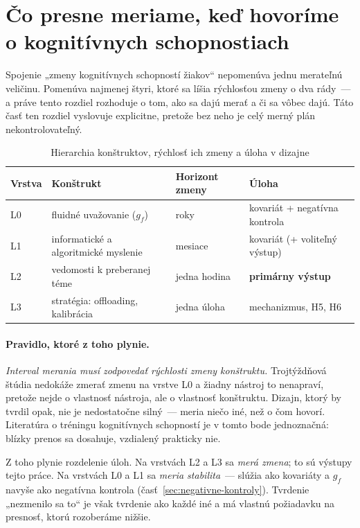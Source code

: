 \section{Čo presne meriame, keď hovoríme o kognitívnych schopnostiach}
\label{sec:konstrukty}

Spojenie „zmeny kognitívnych schopností žiakov“ nepomenúva jednu merateľnú veličinu. Pomenúva najmenej štyri, ktoré sa líšia rýchlosťou zmeny o dva rády~--- a práve tento rozdiel rozhoduje o tom, ako sa dajú merať a či sa vôbec dajú. Táto časť ten rozdiel vyslovuje explicitne, pretože bez neho je celý merný plán nekontrolovateľný.

\begin{table}[H]
\centering
\caption{Hierarchia konštruktov, rýchlosť ich zmeny a úloha v dizajne}
\label{tab:konstrukty}
\small
\begin{tabularx}{\textwidth}{@{}l X l l@{}}
\toprule
\textbf{Vrstva} & \textbf{Konštrukt} & \textbf{Horizont zmeny} & \textbf{Úloha} \\
\midrule
L0 & fluidné uvažovanie ($g_f$) & roky & kovariát + negatívna kontrola \\
L1 & informatické a algoritmické myslenie & mesiace & kovariát (+ voliteľný výstup) \\
L2 & vedomosti k preberanej téme & jedna hodina & \textbf{primárny výstup} \\
L3 & stratégia: offloading, kalibrácia & jedna úloha & mechanizmus, H5, H6 \\
\bottomrule
\end{tabularx}
\end{table}

\paragraph{Pravidlo, ktoré z toho plynie.} \emph{Interval merania musí zodpovedať rýchlosti zmeny konštruktu.} Trojtýždňová štúdia nedokáže zmerať zmenu na vrstve L0 a žiadny nástroj to nenapraví, pretože nejde o vlastnosť nástroja, ale o vlastnosť konštruktu. Dizajn, ktorý by tvrdil opak, nie je nedostatočne silný~--- meria niečo iné, než o čom hovorí. Literatúra o tréningu kognitívnych schopností je v tomto bode jednoznačná: blízky prenos sa dosahuje, vzdialený prakticky nie.

Z toho plynie rozdelenie úloh. Na vrstvách L2 a L3 sa \emph{merá zmena}; to sú výstupy tejto práce. Na vrstvách L0 a L1 sa \emph{meria stabilita}~--- slúžia ako kovariáty a $g_f$ navyše ako negatívna kontrola (časť~\ref{sec:negativne-kontroly}). Tvrdenie „nezmenilo sa to“ je však tvrdenie ako každé iné a má vlastnú požiadavku na presnosť, ktorú rozoberáme nižšie.

